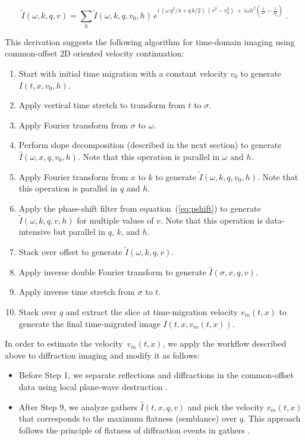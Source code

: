 \begin{equation}
\label{eq:pshiftstps}
\tilde{I}(\omega,k,q,v) = \sum_{h}\tilde{I}(\omega,k,q,v_0,h)\,e^{i\,(\omega\,q^2/4+q\,k/2)\,(v^2-v_0^2)\ +\ i\omega h^2 (\frac{1}{v^2} - \frac{1}{v_0^2})}\;.
\end{equation}

This derivation suggests the following algorithm for time-domain imaging using common-offset 2D oriented velocity continuation: 
\begin{enumerate}
\item Start with initial time migration with a constant velocity $v_0$ to generate $I(t,x,v_0,h)$.
\item Apply vertical time stretch to transform from $t$ to $\sigma$.
\item Apply Fourier transform from $\sigma$ to $\omega$.
\item Perform slope decomposition (described in the next section) to generate $\hat{I}(\omega,x,q,v_0,h)$. Note that this operation is parallel in $\omega$ and $h$.
\item Apply Fourier transform from $x$ to $k$ to generate $\tilde{I}(\omega,k,q,v_0,h)$. Note that this operation is parallel in $q$ and $h$.
\item Apply the phase-shift filter from equation~(\ref{eq:pshift}) to generate $\tilde{I}(\omega,k,q,v,h)$ for multiple values of $v$. Note that this operation is data-intensive but parallel in $q$, $k$, and $h$.
\item Stack over offset to generate $\tilde{I}(\omega,k,q,v)$.
\item Apply inverse double Fourier transform to generate $\hat{I}(\sigma,x,q,v)$.
\item Apply inverse time stretch from $\sigma$ to $t$.
\item Stack over $q$ and extract the slice at time-migration velocity $v_m(t,x)$ to generate the final time-migrated image $I(t,x,v_m(t,x))$.
\end{enumerate}

In order to estimate the velocity~$v_m(t,x)$, we apply the workflow
described above to diffraction imaging and modify it as follows:
\begin{itemize}
\item Before Step 1, we separate reflections and diffractions in the common-offset data using local plane-wave destruction \cite[]{fomel1,diffr,decker}.
\item After Step 9, we analyze  gathers $\hat{I}(t,x,q,v)$ and pick the velocity $v_m(t,x)$ that corresponds to the maximum flatness (semblance) over $q$. This approach follows the principle of flatness of diffraction events in  gathers \cite[]{landa08,reshef09,klokov12}.
\end{itemize}

